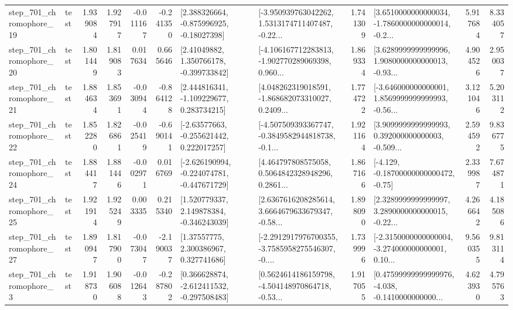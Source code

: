 \begin{tabular}{llrrrrllrlrr}
  step\_701\_chromophore\_19 &      test &      1.939084 &    1.927917 &     -0.011167 & -0.241350 &    [2.388326664, -0.875996925, -0.18027398] &  [-3.950939763042262, 1.5313174711407487, -0.22... &       1.741309 &  [3.6510000000000034, -1.7860000000000014, -0.2... &            5.917684 &          8.334057 \\
  step\_701\_chromophore\_20 &      test &      1.801449 &    1.819083 &      0.017634 &  0.665646 &     [2.41049882, 1.350766178, -0.399733842] &  [-4.106167712283813, -1.902770289069398, 0.960... &       1.869334 &  [3.6289999999999996, 1.9080000000000013, -0.93... &            4.904526 &          2.950037 \\
  step\_701\_chromophore\_21 &      test &      1.884634 &    1.853691 &     -0.030944 & -0.864128 &    [2.444816341, -1.109229677, 0.283734215] &  [4.048262319018591, -1.868682073310027, 0.2409... &       1.774722 &  [-3.646000000000001, 1.8569999999999993, -0.56... &            3.121046 &          5.203112 \\
  step\_701\_chromophore\_22 &      test &      1.852280 &    1.826861 &     -0.025419 & -0.690141 &    [-2.63577663, -0.255621442, 0.222017257] &  [-4.507509393367747, -0.3849582944818738, -0.1... &       1.921164 &  [3.9099999999999993, 0.392000000000003, -0.509... &            2.594592 &          9.836775 \\
  step\_701\_chromophore\_24 &      test &      1.884417 &    1.881446 &     -0.002971 &  0.016769 &  [-2.626190994, -0.224074781, -0.447671729] &  [4.464797808575058, 0.5064842328948296, 0.2861... &       1.867166 &              [-4.129, -0.18700000000000472, -0.75] &            2.339987 &          7.674871 \\
  step\_701\_chromophore\_25 &      test &      1.921914 &    1.925249 &      0.003335 &  0.215340 &    [1.520779337, 2.149878384, -0.346243039] &  [2.6367616208285614, 3.6664679633679347, -0.58... &       1.898090 &  [2.3289999999999997, 3.2890000000000015, -0.22... &            4.266642 &          4.185086 \\
  step\_701\_chromophore\_27 &      test &      1.890947 &    1.817900 &     -0.073047 & -2.190037 &      [1.37557775, 2.300386967, 0.327741686] &  [-2.2912917976700355, -3.7585958275546307, -0.... &       1.739996 &  [-2.3150000000000004, -3.274000000000001, 0.10... &            9.560355 &          9.813114 \\
   step\_701\_chromophore\_3 &      test &      1.918730 &    1.906088 &     -0.012643 & -0.287802 &   [0.366628874, -2.612411532, -0.297508483] &  [0.5624614186159798, -4.504148970864718, -0.53... &       1.917055 &  [0.47599999999999976, -4.038, -0.1410000000000... &            4.623930 &          4.795763 \\

\end{tabular}

